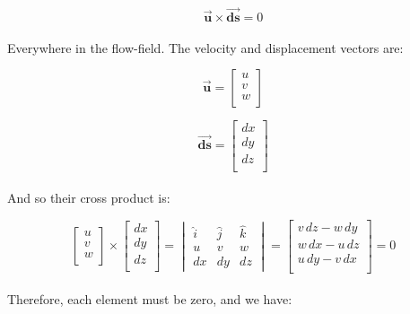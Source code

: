 \documentclass[11pt]{article}
\begin{document}
\begin{equation*}
    \vec{\bm{u}} \times \vec{\bm{ds}} = 0
\end{equation*}\\
\noindent
Everywhere in the flow-field. The velocity and displacement vectors are:

\begin{equation*}
    \vec{\bm{u}} =  \begin{bmatrix}
        u \\
        v \\
        w \\     
        \end{bmatrix}
\end{equation*}

\begin{equation*}
    \vec{\bm{ds}} =  \begin{bmatrix}
        dx \\
        dy \\
        dz \\     
        \end{bmatrix}
\end{equation*} \\ 
\noindent
And so their cross product is:

\begin{equation*}
    \begin{bmatrix}
        u \\
        v \\
        w \\     
    \end{bmatrix} \times \begin{bmatrix}
            dx \\
            dy \\
            dz \\     
    \end{bmatrix} = \begin{vmatrix}
        \hat{i} & \hat{j} & \hat{k} \\
        u & v & w \\
        dx & dy & dz
    \end{vmatrix} = \begin{bmatrix}
        v\,dz - w\,dy \\
        w\,dx - u\,dz \\
        u\,dy - v\,dx \\     
        \end{bmatrix} = 0
\end{equation*} \\ 
\noindent
Therefore, each element must be zero, and we have:
\end{document}
